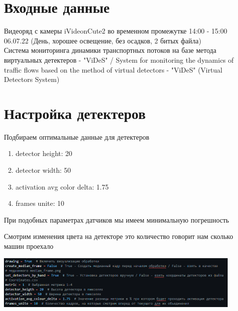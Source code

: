 \documentclass[a4paper,12pt]{article}
\begin{document}

\tableofcontents
\newpage
\section*{Входные данные}
Видеоряд с камеры iVideonCute2 во временном промежутке 14:00 - 15:00 06.07.22
(День, хорошее освещение, без осадков, 2 битых файла)\\
Система мониторинга динамики транспортных потоков на базе метода виртуальных детектеров
- "ViDeS" / System for monitoring the dynamics of traffic flows based on
the method of virtual detectors - "ViDeS" (Virtual Detectors System)


\section*{Настройка детектеров}
\begin{center}
Подбираем оптимальные данные для детектеров
\end{center}
\begin{enumerate}
    \item detector height: 20
    \item detector width: 50
    \item activation avg color delta: 1.75
    \item frames unite: 10
\end{enumerate}
\begin{center}
При подобных параметрах датчиков мы имеем минимальную погрешность
\end{center}
Смотрим изменения цвета на детекторе это количество говорит нам сколько машин проехало
\begin{center}
\includegraphics[width=0.9\textwidth]{detector_code.png}
\end{center}


\newpage
\end{document}
